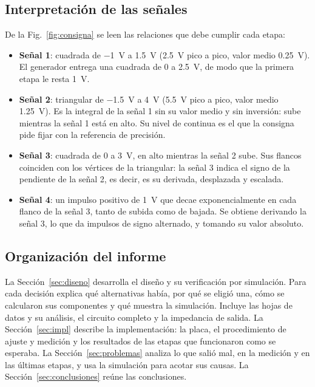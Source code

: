 \subsection{Interpretación de las señales}
De la Fig.~\ref{fig:consigna} se leen las relaciones que debe cumplir cada etapa:
\begin{itemize}[leftmargin=*, nosep]
    \item \textbf{Señal 1}: cuadrada de \SI{-1}{\volt} a \SI{1,5}{\volt} (\SI{2,5}{\volt} pico a pico, valor medio \SI{0,25}{\volt}). El generador entrega una cuadrada de \SI{0}{} a \SI{2,5}{\volt}, de modo que la primera etapa le resta \SI{1}{\volt}.
    \item \textbf{Señal 2}: triangular de \SI{-1,5}{\volt} a \SI{4}{\volt} (\SI{5,5}{\volt} pico a pico, valor medio \SI{1,25}{\volt}). Es la integral de la señal 1 sin su valor medio y sin inversión: sube mientras la señal 1 está en alto. Su nivel de continua es el que la consigna pide fijar con la referencia de precisión.
    \item \textbf{Señal 3}: cuadrada de \SI{0}{} a \SI{3}{\volt}, en alto mientras la señal 2 sube. Sus flancos coinciden con los vértices de la triangular: la señal 3 indica el signo de la pendiente de la señal 2, es decir, es su derivada, desplazada y escalada.
    \item \textbf{Señal 4}: un impulso positivo de \SI{1}{\volt} que decae exponencialmente en cada flanco de la señal 3, tanto de subida como de bajada. Se obtiene derivando la señal 3, lo que da impulsos de signo alternado, y tomando su valor absoluto.
\end{itemize}

\subsection{Organización del informe}
La Sección~\ref{sec:diseno} desarrolla el diseño y su verificación por simulación. Para cada decisión explica qué alternativas había, por qué se eligió una, cómo se calcularon sus componentes y qué muestra la simulación. Incluye las hojas de datos y su análisis, el circuito completo y la impedancia de salida. La Sección~\ref{sec:impl} describe la implementación: la placa, el procedimiento de ajuste y medición y los resultados de las etapas que funcionaron como se esperaba. La Sección~\ref{sec:problemas} analiza lo que salió mal, en la medición y en las últimas etapas, y usa la simulación para acotar sus causas. La Sección~\ref{sec:conclusiones} reúne las conclusiones.

